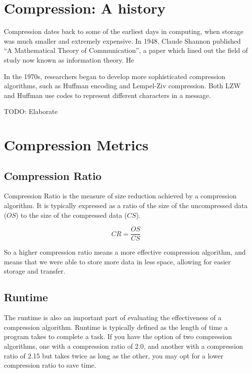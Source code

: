 \documentclass[12pt,twoside]{reedthesis}
\begin{document}
\hypertarget{compression-a-history}{%
\section{Compression: A history}\label{compression-a-history}}

Compression dates back to some of the earliest days in computing, when storage was much smaller and extremely expensive. In 1948, Claude Shannon published ``A Mathematical Theory of Communication'', a paper which lined out the field of study now known as information theory. He

In the 1970s, researchers began to develop more sophisticated compression algorithms, such as Huffman encoding and Lempel-Ziv compression. Both LZW and Huffman use codes to represent different characters in a message.

TODO: Elaborate

\hypertarget{compression-metrics}{%
\section{Compression Metrics}\label{compression-metrics}}

\hypertarget{compression-ratio}{%
\subsection{Compression Ratio}\label{compression-ratio}}

Compression Ratio is the measure of size reduction achieved by a compression algorithm. It is typically expressed as a ratio of the size of the uncompressed data (\(OS\)) to the size of the compressed data (\(CS\)).

\[CR = \frac{OS}{CS}\]

So a higher compression ratio means a more effective compression algorithm, and means that we were able to store more data in less space, allowing for easier storage and transfer.

\hypertarget{runtime}{%
\subsection{Runtime}\label{runtime}}

The runtime is also an important part of evaluating the effectiveness of a compression algorithm. Runtime is typically defined as the length of time a program takes to complete a task. If you have the option of two compression algorithms, one with a compression ratio of 2.0, and another with a compression ratio of 2.15 but takes twice as long as the other, you may opt for a lower compression ratio to save time.
\end{document}
